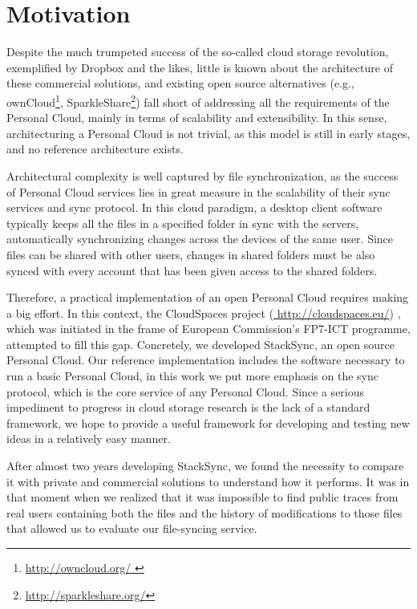 \section{Motivation}

Despite the much trumpeted success of the so-called cloud storage revolution, exemplified by Dropbox and the 
likes, little is known about the architecture of these commercial solutions, and existing open source alternatives 
(e.g., ownCloud\footnote{\url{ http://owncloud.org/ }}, SparkleShare\footnote{\url{ http://sparkleshare.org/}})
fall short of addressing all the requirements of the Personal Cloud, mainly in terms of scalability and extensibility. 
In this sense, architecturing a Personal Cloud is not trivial, as this model is still in early stages, and no reference architecture exists.

Architectural complexity is well captured by file synchronization, as the success of Personal Cloud services
lies in great measure in the scalability of their sync services and sync protocol. In this cloud paradigm, a desktop client
software typically keeps all the files in a specified folder in sync with the servers, automatically synchronizing changes across the devices of the same user. Since files can be shared with other users, changes in
shared folders must be also synced with every account that has been given access to the shared folders.

Therefore, a practical implementation of an open Personal Cloud requires making a big effort. In
this context, the CloudSpaces project (\url{ http://cloudspaces.eu/}) , which was initiated
in the frame of European Commission's FP7-ICT programme, attempted to fill this gap. Concretely,
we developed StackSync, an open source Personal Cloud. Our reference implementation includes the
software necessary to run a basic Personal Cloud, in this work we put more emphasis on the sync protocol, which
is the core service of any Personal Cloud. Since a serious impediment to progress in cloud storage
research is the lack of a standard framework, we hope to provide a useful framework for developing
and testing new ideas in a relatively easy manner.

After almost two years developing StackSync, we found the necessity to compare it with
private and commercial solutions to understand how it performs. It was in that moment when we realized
that it was impossible to find public traces from real users containing both the files and the history
of modifications to those files that allowed us to evaluate our file-syncing service.

